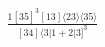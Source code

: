\documentclass[varwidth, border=5pt]{standalone}
\begin{document}
\begin{my}
$\begin{gathered}
\scriptscriptstyle\frac{1[35]^3[13]⟨23⟩⟨35⟩}{[34]⟨3|1+2|3]^3}
\end{gathered}$
\end{my}
\end{document}
